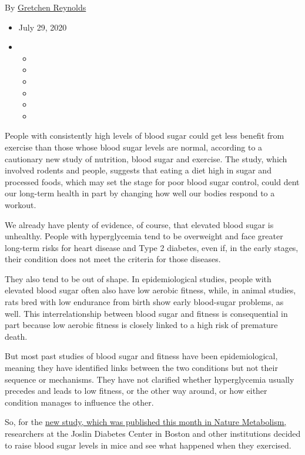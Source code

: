 By
\href{https://www.nytimes3xbfgragh.onion/by/gretchen-reynolds}{Gretchen
Reynolds}

\begin{itemize}
\item
  July 29, 2020
\item
  \begin{itemize}
  \item
  \item
  \item
  \item
  \item
  \item
  \end{itemize}
\end{itemize}

People with consistently high levels of blood sugar could get less
benefit from exercise than those whose blood sugar levels are normal,
according to a cautionary new study of nutrition, blood sugar and
exercise. The study, which involved rodents and people, suggests that
eating a diet high in sugar and processed foods, which may set the stage
for poor blood sugar control, could dent our long-term health in part by
changing how well our bodies respond to a workout.

We already have plenty of evidence, of course, that elevated blood sugar
is unhealthy. People with hyperglycemia tend to be overweight and face
greater long-term risks for heart disease and Type 2 diabetes, even if,
in the early stages, their condition does not meet the criteria for
those diseases.

They also tend to be out of shape. In epidemiological studies, people
with elevated blood sugar often also have low aerobic fitness, while, in
animal studies, rats bred with low endurance from birth show early
blood-sugar problems, as well. This interrelationship between blood
sugar and fitness is consequential in part because low aerobic fitness
is closely linked to a high risk of premature death.

But most past studies of blood sugar and fitness have been
epidemiological, meaning they have identified links between the two
conditions but not their sequence or mechanisms. They have not clarified
whether hyperglycemia usually precedes and leads to low fitness, or the
other way around, or how either condition manages to influence the
other.

So, for the \href{https://www.nature.com/articles/s42255-020-0240-7}{new
study, which was published this month in Nature Metabolism,} researchers
at the Joslin Diabetes Center in Boston and other institutions decided
to raise blood sugar levels in mice and see what happened when they
exercised.

